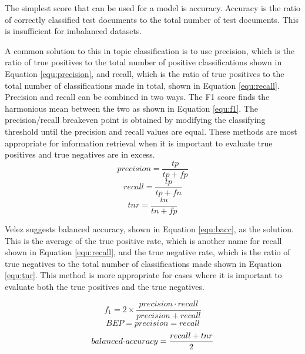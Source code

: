 			The simplest score that can be used for a model is accuracy. Accuracy is the ratio of correctly classified test documents to the total number of test documents. This is insufficient for imbalanced datasets\cite{balanced_accuracy_velez}.
			
			A common solution to this in topic classification is to use precision, which is the ratio of true positives to the total number of positive classifications shown in Equation \ref{equ:precision}, and recall, which is the ratio of true positives to the total number of classifications made in total, shown in Equation \ref{equ:recall}. Precision and recall can be combined in two ways. The F1 score finds the harmonious mean between the two as shown in Equation \ref{equ:f1}. The precision/recall breakeven point is obtained by modifying the classifying threshold until the precision and recall values are equal\cite{ml_automated_sebastiani}. These methods are most appropriate for information retrieval when it is important to evaluate true positives and true negatives are in excess\cite{markedness_correlation_powers}.
			\begin{equation}\label{equ:precision}
				precision = \frac{tp}{tp + fp}
			\end{equation}
			\begin{equation}\label{equ:recall}
				recall = \frac{tp}{tp + fn}
			\end{equation}
			\begin{equation}\label{equ:tnr}
				tnr = \frac{tn}{tn + fp}
			\end{equation}

			Velez suggests balanced accuracy, shown in Equation \ref{equ:bacc}, as the solution. This is the average of the true positive rate, which is another name for recall shown in Equation \ref{equ:recall}, and the true negative rate, which is the ratio of true negatives to the total number of classifications made shown in Equation \ref{equ:tnr}. This method is more appropriate for cases where it is important to evaluate both the true positives and the true negatives.

			\begin{equation}\label{equ:f1}
				f_1 = 2 \times \frac{precision \cdot recall}{precision + recall}
			\end{equation}
			\begin{equation}\label{equ:bep}
				BEP = precision = recall
			\end{equation}
			\begin{equation}\label{equ:bacc}
				balanced\textnormal{-}accuracy = \frac{recall + tnr}{2}
			\end{equation}


